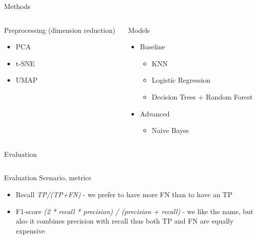 \documentclass{beamer}
\begin{document}
\begin{frame}[t]{Methods}



\begin{columns}
\begin{column}[t]{0.5\textwidth}
Preprocessing (dimension reduction)

\begin{itemize}
\item PCA
\item t-SNE
\item UMAP
\end{itemize}
\end{column}

\begin{column}[t]{0.5\textwidth}
Models

\begin{itemize}
\item Baseline
\begin{itemize}
    \item KNN
    \item Logistic Regression
    \item Decision Trees + Random Forest
\end{itemize}
\item Advanced
\begin{itemize}
    \item Naive Bayes
\end{itemize}
\end{itemize}
\end{column}
\end{columns}
\end{frame}


\begin{frame}[t]{Evaluation}

\begin{columns}
\begin{column}[t]{0.5\textwidth}
Evaluation Scenario, metrics

\begin{itemize}
\item Recall {\it TP/(TP+FN)} - we prefer to have more FN than to have an TP
\item F1-score {\it (2 * recall * precision) / (precision + recall)} - we like the name, but also it combines precision with recall thus both TP and FN are equally expensive
\end{itemize}

\end{column}

\end{columns}

\end{frame}
\end{document}
